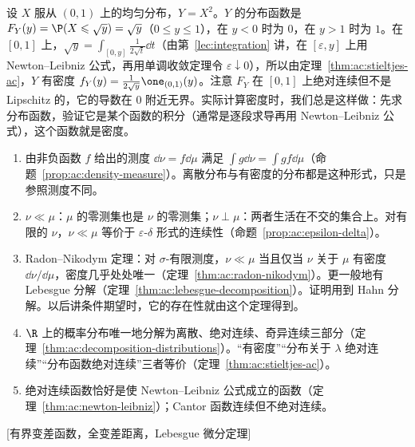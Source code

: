 \begin{example}
设 $X$ 服从 $(0,1)$ 上的均匀分布，$Y=X^2$。$Y$ 的分布函数是 $F_Y(y)=\P(X\leqslant\sqrt y)=\sqrt y$（$0\leqslant y\leqslant1$），在 $y<0$ 时为 $0$，在 $y>1$ 时为 $1$。在 $[0,1]$ 上，$\sqrt y=\int_{[0,y]}\frac1{2\sqrt t}\dd t$（由第~\ref{lec:integration} 讲，在 $[\varepsilon,y]$ 上用 Newton--Leibniz 公式，再用单调收敛定理令 $\varepsilon\downarrow0$），所以由定理~\ref{thm:ac:stieltjes-ac}，$Y$ 有密度 $f_Y(y)=\frac1{2\sqrt y}\one_{(0,1)}(y)$。注意 $F_Y$ 在 $[0,1]$ 上绝对连续但不是 Lipschitz 的，它的导数在 $0$ 附近无界。实际计算密度时，我们总是这样做：先求分布函数，验证它是某个函数的积分（通常是逐段求导再用 Newton--Leibniz 公式），这个函数就是密度。
\end{example}


\begin{enumerate}
\item 由非负函数 $f$ 给出的测度 $\dd\nu=f\dd\mu$ 满足 $\int g\dd\nu=\int gf\dd\mu$（命题~\ref{prop:ac:density-measure}）。离散分布与有密度的分布都是这种形式，只是参照测度不同。
\item $\nu\ll\mu$：$\mu$ 的零测集也是 $\nu$ 的零测集；$\nu\perp\mu$：两者生活在不交的集合上。对有限的 $\nu$，$\nu\ll\mu$ 等价于 $\varepsilon$-$\delta$ 形式的连续性（命题~\ref{prop:ac:epsilon-delta}）。
\item Radon--Nikodym 定理：对 $\sigma$-有限测度，$\nu\ll\mu$ 当且仅当 $\nu$ 关于 $\mu$ 有密度 $\dd\nu/\dd\mu$，密度几乎处处唯一（定理~\ref{thm:ac:radon-nikodym}）。更一般地有 Lebesgue 分解（定理~\ref{thm:ac:lebesgue-decomposition}）。证明用到 Hahn 分解。以后讲条件期望时，它的存在性就由这个定理得到。
\item $\R$ 上的概率分布唯一地分解为离散、绝对连续、奇异连续三部分（定理~\ref{thm:ac:decomposition-distributions}）。“有密度”“分布关于 $\lambda$ 绝对连续”“分布函数绝对连续”三者等价（定理~\ref{thm:ac:stieltjes-ac}）。
\item 绝对连续函数恰好是使 Newton--Leibniz 公式成立的函数（定理~\ref{thm:ac:newton-leibniz}）；Cantor 函数连续但不绝对连续。
\end{enumerate}

[有界变差函数，全变差距离，Lebesgue 微分定理]
\label{hw:absolute-continuity}


